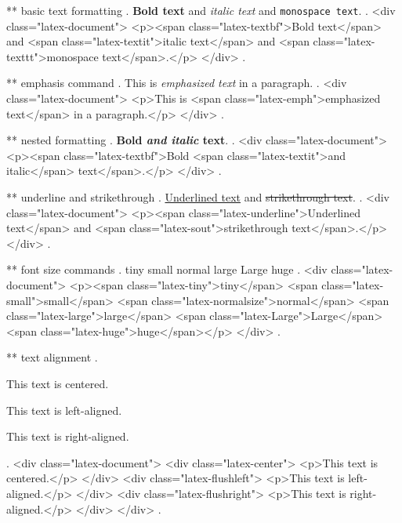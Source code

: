 ** basic text formatting
.
\textbf{Bold text} and \textit{italic text} and \texttt{monospace text}.
.
<div class="latex-document">
<p><span class="latex-textbf">Bold text</span> and <span class="latex-textit">italic text</span> and <span class="latex-texttt">monospace text</span>.</p>
</div>
.


** emphasis command
.
This is \emph{emphasized text} in a paragraph.
.
<div class="latex-document">
<p>This is <span class="latex-emph">emphasized text</span> in a paragraph.</p>
</div>
.


** nested formatting
.
\textbf{Bold \textit{and italic} text}.
.
<div class="latex-document">
<p><span class="latex-textbf">Bold <span class="latex-textit">and italic</span> text</span>.</p>
</div>
.


** underline and strikethrough
.
\underline{Underlined text} and \sout{strikethrough text}.
.
<div class="latex-document">
<p><span class="latex-underline">Underlined text</span> and <span class="latex-sout">strikethrough text</span>.</p>
</div>
.


** font size commands
.
\tiny{tiny} \small{small} \normalsize{normal} \large{large} \Large{Large} \huge{huge}
.
<div class="latex-document">
<p><span class="latex-tiny">tiny</span> <span class="latex-small">small</span> <span class="latex-normalsize">normal</span> <span class="latex-large">large</span> <span class="latex-Large">Large</span> <span class="latex-huge">huge</span></p>
</div>
.


** text alignment
.
\begin{center}
This text is centered.
\end{center}

\begin{flushleft}
This text is left-aligned.
\end{flushleft}

\begin{flushright}
This text is right-aligned.
\end{flushright}
.
<div class="latex-document">
<div class="latex-center">
<p>This text is centered.</p>
</div>
<div class="latex-flushleft">
<p>This text is left-aligned.</p>
</div>
<div class="latex-flushright">
<p>This text is right-aligned.</p>
</div>
</div>
.
